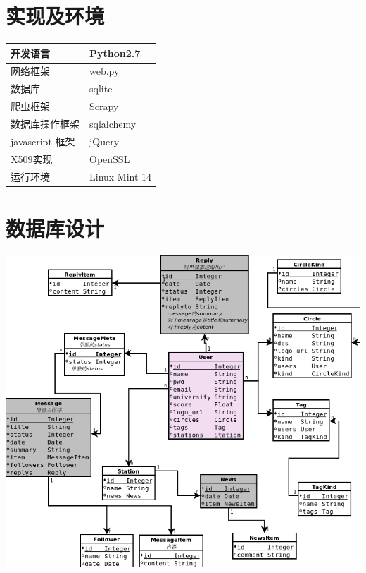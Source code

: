 \documentclass[a4paper]{ctexart}
\begin{document}
\newpage
\section{实现及环境}
    \begin{center}
    \begin{tabular}[]{l|l}
        \hline
        开发语言        &   Python2.7       \\ 
        \hline
        网络框架        &   web.py          \\
        \hline
        数据库          &   sqlite          \\
        \hline
        爬虫框架            &   Scrapy          \\
        \hline
        数据库操作框架  &   sqlalchemy      \\
        \hline
        javascript 框架 &   jQuery          \\
        \hline
        X509实现        &   OpenSSL         \\
        \hline
        运行环境        &   Linux Mint 14   \\
        \hline
    \end{tabular}
    \end{center}

    \newpage
    \section{数据库设计}
    \begin{center}
        \includegraphics[width=500pt]{db.png}
    \end{center}
\end{document}
